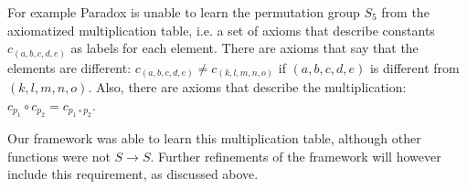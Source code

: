 For example Paradox is unable to learn the permutation group $S_5$ from the axiomatized multiplication table, i.e. a set of axioms that describe constants $c_{(a,b,c,d,e)}$ as labels for each element. There are axioms that say that the elements are different: $c_{(a,b,c,d,e)}\neq c_{(k,l,m,n,o)}$ if $(a,b,c,d,e)$ is different from $(k,l,m,n,o)$. Also, there are axioms that describe the multiplication: $c_{p_1}\circ c_{p_2}=c_{p_1\circ p_2}$.

Our framework was able to learn this multiplication table, although other functions were not $S\rightarrow S$. Further refinements of the framework will however include this requirement, as discussed above.